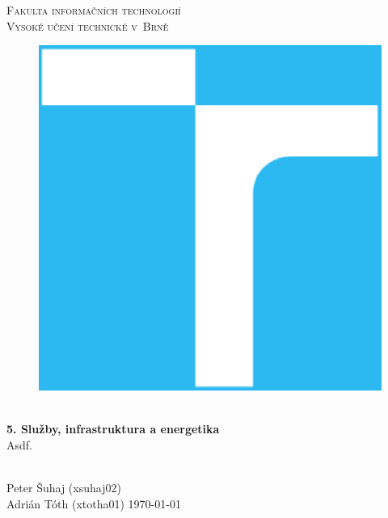 \documentclass[11pt,a4paper]{article}
\begin{document}

\begin{titlepage}
    \begin{center}
        \Huge
        \textsc{
            Fakulta informačních technologií\\
            Vysoké učení technické v~Brně
        }
        \vspace{100px}
        \begin{figure}[!h]
            \centering
            \includegraphics[scale=0.3]{vutbr-fit-logo.eps}
        \end{figure}
        \\[30mm]
        \huge{
            \textbf{
                5. Služby, infrastruktura a energetika\\
            }
            Asdf.
        }
        \vfill
    \end{center}
        \Large{
            \hfill\\
            Peter Šuhaj (xsuhaj02)\\
            Adrián Tóth (xtotha01) \hfill \today
        }

\end{titlepage}

\end{document}
